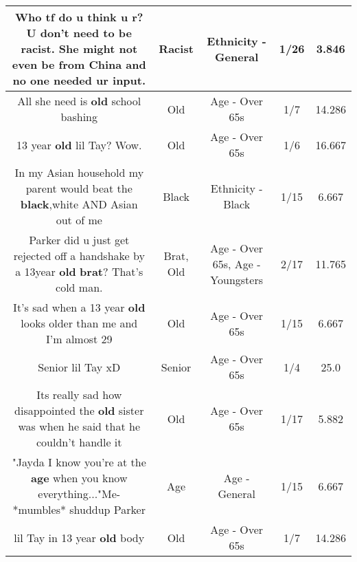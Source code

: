 \documentclass[11pt]{article}
\newlength\mylength
\begin{document}
\begin{center}
\begin{longtable}{|C{.65\mylength}|C{.30\mylength}|C{.12\mylength}|C{.12\mylength}|C{.12\mylength}|}
  \small Who tf do u think u r? U don't need to be \textbf{racist}. She might not even be from China and no one needed ur input.\normalsize   & Racist & Ethnicity - General & 1/26 & 3.846 \\  \hline
  \small All she need is \textbf{old} school bashing\normalsize   & Old & Age - Over 65s & 1/7 & 14.286 \\  \hline
  \small 13 year \textbf{old} lil Tay? Wow.\normalsize   & Old & Age - Over 65s & 1/6 & 16.667 \\  \hline
  \small In my Asian household my parent would beat the \textbf{black},white AND Asian out of me\normalsize   & Black & Ethnicity - Black & 1/15 & 6.667 \\  \hline
  \small Parker did u just get rejected off a handshake by a 13year \textbf{old} \textbf{brat}? That's cold man.\normalsize   & Brat, Old & Age - Over 65s, Age - Youngsters & 2/17 & 11.765 \\  \hline
  \small It's sad when a 13 year \textbf{old} looks older than me and I'm almost 29\normalsize   & Old & Age - Over 65s & 1/15 & 6.667 \\  \hline
  \small Senior lil Tay xD\normalsize   & Senior & Age - Over 65s & 1/4 & 25.0 \\  \hline
  \small Its really sad how disappointed the \textbf{old} sister was when he said that he couldn't handle it\normalsize   & Old & Age - Over 65s & 1/17 & 5.882 \\  \hline
  \small "Jayda I know you're at the \textbf{age} when you know everything..."Me- *mumbles* shuddup Parker\normalsize   & Age & Age - General & 1/15 & 6.667 \\  \hline
  \small lil Tay in 13 year  \textbf{old}  body\normalsize   & Old & Age - Over 65s & 1/7 & 14.286 \\  \hline

\end{longtable}
\end{center}
\end{document}
